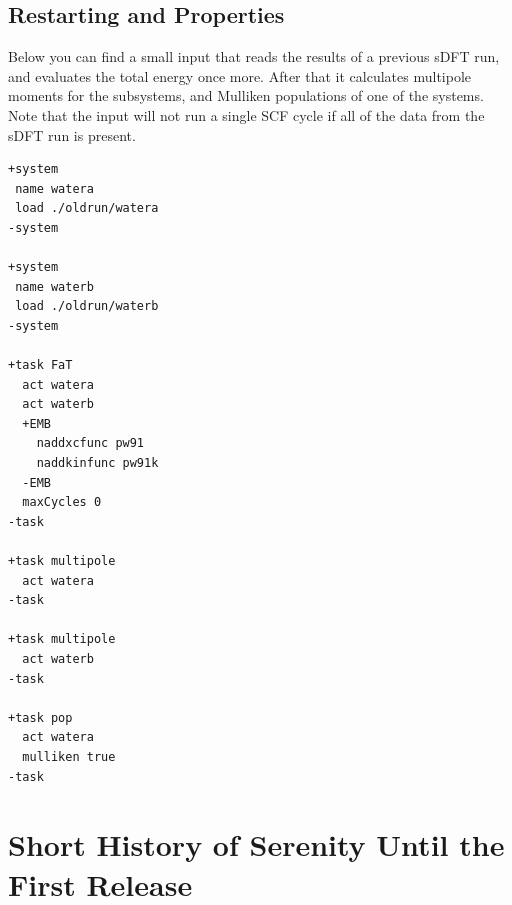 \documentclass[bibliography=totocnumbered,a4paper,10pt,oneside]{scrbook}
\begin{document}
\section{Restarting and Properties}
Below you can find a small input that reads the results of a previous sDFT run, and evaluates the total energy once more.
After that it calculates multipole moments for the subsystems, and Mulliken populations of one of the systems.
Note that the input will not run a single SCF cycle if all of the data from the sDFT run is present.
\begin{lstlisting}
+system
 name watera
 load ./oldrun/watera
-system

+system
 name waterb
 load ./oldrun/waterb
-system

+task FaT
  act watera
  act waterb
  +EMB
    naddxcfunc pw91
    naddkinfunc pw91k
  -EMB
  maxCycles 0
-task

+task multipole
  act watera
-task

+task multipole
  act waterb
-task

+task pop
  act watera
  mulliken true
-task
\end{lstlisting}

\clearpage
\chapter{Short History of Serenity Until the First Release}
\end{document}
